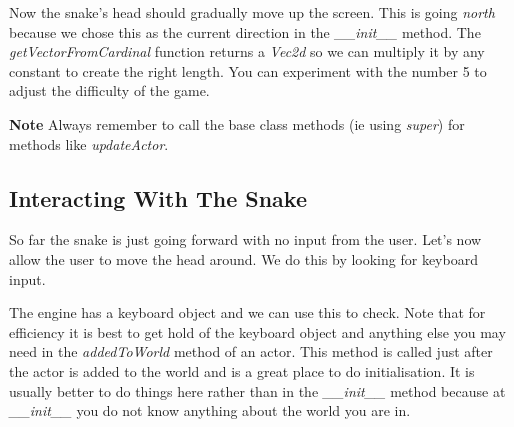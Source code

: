 \documentclass[letterpaper,10pt,english]{sphinxmanual}
\begin{document}
Now the snake's head should gradually move up the screen. This is going \emph{north} because we
chose this as the current direction in the \emph{\_\_init\_\_} method. The \emph{getVectorFromCardinal} function
returns a \emph{Vec2d} so we can multiply it by any constant to create the right length. You can
experiment with the number 5 to adjust the difficulty of the game.

\textbf{Note} Always remember to call the base class methods (ie using \emph{super}) for methods like \emph{updateActor}.


\subsection{Interacting With The Snake}
\label{tutorial-1:interacting-with-the-snake}
So far the snake is just going forward with no input from the user. Let's now allow the user to
move the head around. We do this by looking for keyboard input.

The engine has a keyboard object and we can use this to check. Note that for efficiency it is
best to get hold of the keyboard object and anything else you may need in the \emph{addedToWorld} method
of an actor. This method is called just after the actor is added to the world and is a great
place to do initialisation. It is usually better to do things here rather than in the \emph{\_\_init\_\_} method
because at \emph{\_\_init\_\_} you do not know anything about the world you are in.
\end{document}
